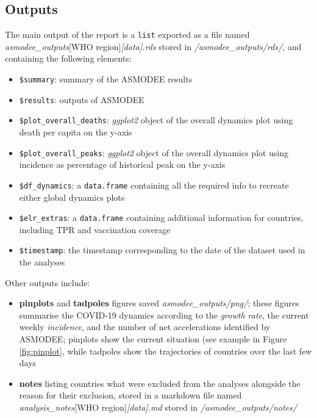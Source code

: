 \documentclass[]{book}
\providecommand{\tightlist}{%
  \setlength{\itemsep}{0pt}\setlength{\parskip}{0pt}}
\begin{document}
\hypertarget{outputs-1}{%
\subsection{Outputs}\label{outputs-1}}

The main output of the report is a \texttt{list} exported as a file named
\emph{asmodee\_outputs}{[}WHO region{]}\emph{{[}data{]}.rds} stored in \emph{/asmodee\_outputs/rds/}, and
containing the following elements:

\begin{itemize}
\tightlist
\item
  \texttt{\$summary}: summary of the ASMODEE results
\item
  \texttt{\$results}: outputs of ASMODEE
\item
  \texttt{\$plot\_overall\_deaths}: \emph{ggplot2} object of the overall dynamics plot using
  death per capita on the y-axis
\item
  \texttt{\$plot\_overall\_peaks}: \emph{ggplot2} object of the overall dynamics plot using
  incidence as percentage of historical peak on the y-axis
\item
  \texttt{\$df\_dynamics}: a \texttt{data.frame} containing all the required info to recreate
  either global dynamics plots
\item
  \texttt{\$elr\_extras}: a \texttt{data.frame} containing additional information for countries,
  including TPR and vaccination coverage
\item
  \texttt{\$timestamp}: the timestamp corresponding to the date of the dataset used in
  the analyses
\end{itemize}

Other outputs include:

\begin{itemize}
\item
  \textbf{pinplots} and \textbf{tadpoles} figures saved \emph{asmodee\_outputs/png/}; these
  figures summarise the COVID-19 dynamics according to the \emph{growth rate}, the
  current weekly \emph{incidence}, and the number of net accelerations identified by
  ASMODEE; pinplots show the current situation (see example in Figure
  \ref{fig:pinplot}, while tadpoles show the trajectories of countries over the
  last few days
\item
  \textbf{notes} listing countries what were excluded from the analyses alongside the
  reason for their exclusion, stored in a markdown file named \emph{analysis\_notes}{[}WHO
  region{]}\emph{{[}data{]}.md} stored in \emph{/asmodee\_outputs/notes/}
\end{itemize}
\end{document}
